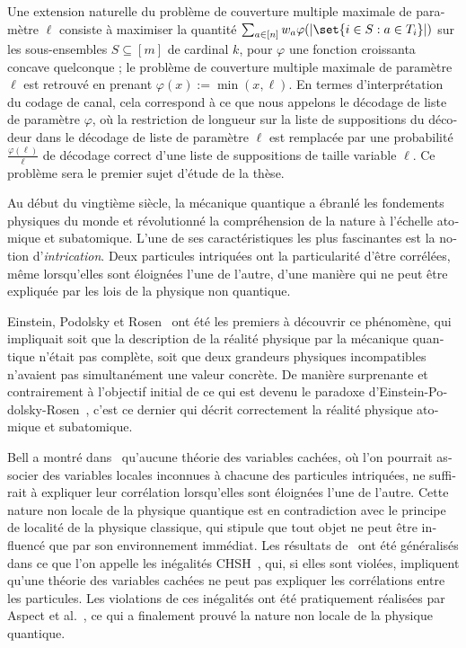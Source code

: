 \begin{otherlanguage}{french}
Une extension naturelle du problème de couverture multiple maximale de paramètre $\ell$ consiste à maximiser la quantité $\sum_{a \in [n]} w_a\varphi(\abs{\set{i \in S : a \in T_i}})$ sur les sous-ensembles $S \subseteq [m]$ de cardinal $k$, pour $\varphi$ une fonction croissanta concave quelconque ; le problème de couverture multiple maximale de paramètre $\ell$ est retrouvé en prenant $\varphi(x) := \min(x,\ell)$. En termes d'interprétation du codage de canal, cela correspond à ce que nous appelons le décodage de liste de paramètre $\varphi$, où la restriction de longueur sur la liste de suppositions du décodeur dans le décodage de liste de paramètre $\ell$ est remplacée par une probabilité $\frac{\varphi(\ell)}{\ell}$ de décodage correct d'une liste de suppositions de taille variable $\ell$. Ce problème sera le premier sujet d'étude de la thèse.

Au début du vingtième siècle, la mécanique quantique a ébranlé les fondements physiques du monde et révolutionné la compréhension de la nature à l'échelle atomique et subatomique. L'une de ses caractéristiques les plus fascinantes est la notion d'\emph{intrication}. Deux particules intriquées ont la particularité d'être corrélées, même lorsqu'elles sont éloignées l'une de l'autre, d'une manière qui ne peut être expliquée par les lois de la physique non quantique.

Einstein, Podolsky et Rosen~\cite{EPR35} ont été les premiers à découvrir ce phénomène, qui impliquait soit que la description de la réalité physique par la mécanique quantique n'était pas complète, soit que deux grandeurs physiques incompatibles n'avaient pas simultanément une valeur concrète. De manière surprenante et contrairement à l'objectif initial de ce qui est devenu le paradoxe d'Einstein-Podolsky-Rosen~\cite{EPR35}, c'est ce dernier qui décrit correctement la réalité physique atomique et subatomique.

Bell a montré dans~\cite{Bell64} qu'aucune théorie des variables cachées, où l'on pourrait associer des variables locales inconnues à chacune des particules intriquées, ne suffirait à expliquer leur corrélation lorsqu'elles sont éloignées l'une de l'autre. Cette nature non locale de la physique quantique est en contradiction avec le principe de localité de la physique classique, qui stipule que tout objet ne peut être influencé que par son environnement immédiat. Les résultats de~\cite{Bell64} ont été généralisés dans ce que l'on appelle les inégalités CHSH~\cite{CHSH69}, qui, si elles sont violées, impliquent qu'une théorie des variables cachées ne peut pas expliquer les corrélations entre les particules. Les violations de ces inégalités ont été pratiquement réalisées par Aspect et al.~\cite{ADG82}, ce qui a finalement prouvé la nature non locale de la physique quantique.


\end{otherlanguage}

